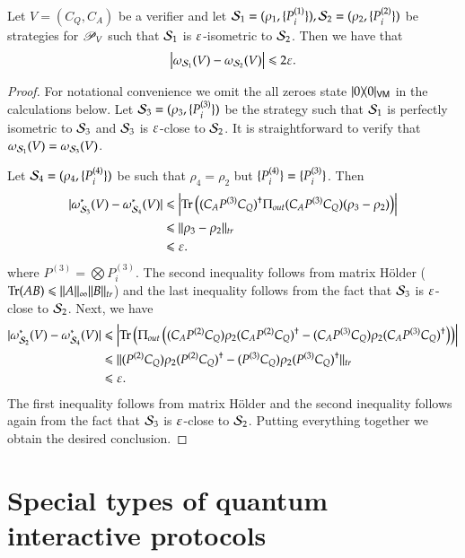 \begin{lemma}
\label{lem:close_strategies}
	Let $V = (C_Q,C_A)$ be a verifier and let $\mathcal{S}_1 = (\rho_1,\{P^{(1)}_i\}),\mathcal{S}_2= (\rho_2,\{P^{(2)}_i\})$ be strategies for $\mathscr{P}_V$ such that $\mathcal{S}_1$ is $\varepsilon$-isometric to $\mathcal{S}_2$. Then we have that
	\[
		\left\lvert \omega_{\mathcal{S}_1}(V) - \omega_{\mathcal{S}_2}(V) \right\rvert \leqslant 2\varepsilon.
	\]
\end{lemma}
\begin{proof}
For notational convenience we omit the all zeroes state $|0\rangle\! \langle 0|_{{\mathsf{V}} {\mathsf{M}}}$ in the calculations below. Let $\mathcal{S}_3= (\rho_3,\{P^{(3)}_i\})$ be the strategy such that $\mathcal{S}_1$ is perfectly isometric to $\mathcal{S}_3$ and $\mathcal{S}_3$ is $\varepsilon$-close to $\mathcal{S}_2$. It is straightforward to verify that $\omega_{\mathcal{S}_1}(V) = \omega_{\mathcal{S}_3}(V)$. 
	
	Let $\mathcal{S}_4 = (\rho_4,\{ P^{(4)}_i\})$ be such that $\rho_4 = \rho_2$ but $\{P^{(4)}_i\} = \{P^{(3)}_i\}$. Then
	\begin{align*}
		\lvert \omega^*_{\mathcal{S}_3}(V) - \omega^*_{\mathcal{S}_4}(V)\rvert &\leqslant \left\lvert \operatorname{Tr}\left( (C_A P^{(3)} C_Q)^\dagger \Pi_{out} (C_A P^{(3)} C_Q) (\rho_3 - \rho_2)\right) \right\rvert \\
		&\leqslant \lVert \rho_3 - \rho_2\rVert_{tr} \\
		&\leqslant \varepsilon.
	\end{align*}
	where $P^{(3)} = \bigotimes P^{(3)}_i$. The second inequality follows from matrix H\"{o}lder ($\operatorname{Tr}(AB) \leqslant \|A\|_\infty \|B\|_{tr}$) and the last inequality follows from the fact that $\mathcal{S}_3$ is $\varepsilon$-close to $\mathcal{S}_2$.
	Next, we have
	\begin{align*}
		\lvert \omega^*_{\mathcal{S}_2}(V) - \omega^*_{\mathcal{S}_4}(V)\rvert &\leqslant \left\lvert \operatorname{Tr}\left( \Pi_{out} \left( (C_A P^{(2)} C_Q)\rho_2 (C_A P^{(2)} C_Q)^\dagger  - (C_A P^{(3)} C_Q) \rho_2 (C_A P^{(3)} C_Q)^\dagger  \right) \right)\right\rvert \\
		&\leqslant \lVert (P^{(2)} C_Q) \rho_2 (P^{(2)} C_Q)^\dagger - (P^{(3)} C_Q) \rho_2 (P^{(3)} C_Q)^\dagger\rVert_{tr} \\
		&\leqslant \varepsilon.
	\end{align*}	
	The first inequality follows from matrix H\"{o}lder and the second inequality follows again from the fact that $\mathcal{S}_3$ is $\varepsilon$-close to $\mathcal{S}_2$. Putting everything together we obtain the desired conclusion.

\end{proof}



\section{Special types of quantum interactive protocols}

